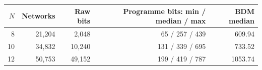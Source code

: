 \begin{tabular}{rrrrr}
\toprule
$N$ & Networks & Raw bits & Programme bits: min / median / max & BDM median \\
\midrule
8 & 21,204 & 2,048 & 65 / 257 / 439 & 609.94 \\
10 & 34,832 & 10,240 & 131 / 339 / 695 & 733.52 \\
12 & 50,753 & 49,152 & 199 / 419 / 787 & 1053.74 \\
\bottomrule
\end{tabular}

